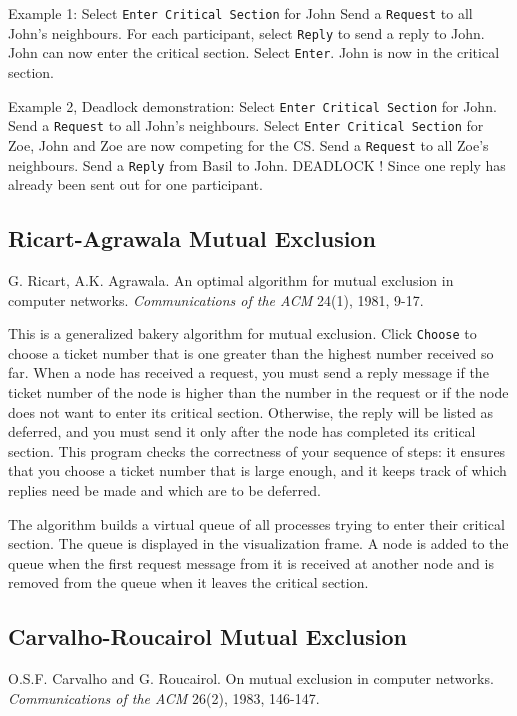 \documentclass[11pt]{article}
\newcommand{\p}[1]{\texttt{#1}}
\begin{document}
Example 1:
Select \p{Enter Critical Section} for John
Send a \p{Request} to all John's neighbours.
For each participant, select \p{Reply} to send a reply to John.
John can now enter the critical section. Select \p{Enter}.
John is now in the critical section.

Example 2, Deadlock demonstration:
Select \p{Enter Critical Section} for John.
Send a \p{Request} to all John's neighbours.
Select \p{Enter Critical Section} for Zoe, John and Zoe are now competing for the CS.
Send a \p{Request} to all Zoe's neighbours.
Send a \p{Reply} from Basil to John.
DEADLOCK ! Since one reply has already been sent out for one participant.

\subsection{Ricart-Agrawala Mutual Exclusion}

G. Ricart, A.K. Agrawala.
An optimal algorithm for mutual exclusion
in computer networks.
\emph{Communications of the ACM} 24(1), 1981, 9-17.

This is a generalized bakery algorithm for mutual exclusion.
Click \p{Choose} to choose a ticket number that is one greater
than the highest number received so far.
When a node has received a request, you must send a reply message
if the ticket number of the node is higher than the number in
the request or if the node does not want to enter its critical
section. Otherwise, the reply will be listed as deferred, and
you must send it only after the node has completed its critical
section.
This program checks the correctness of your sequence of steps: it
ensures that you choose a ticket number that is large enough,
and it keeps track of which replies need be made and which are
to be deferred.

The algorithm builds a virtual queue of all processes trying to enter their
critical section.
The queue is displayed in the visualization frame.
A node is added to the queue when the first request message from it is received
at another node and is removed from the queue when it leaves the critical section.

\subsection{Carvalho-Roucairol Mutual Exclusion}

O.S.F. Carvalho and G. Roucairol.
On mutual exclusion in computer networks.
\emph{Communications of the ACM} 26(2), 1983, 146-147.
\end{document}
